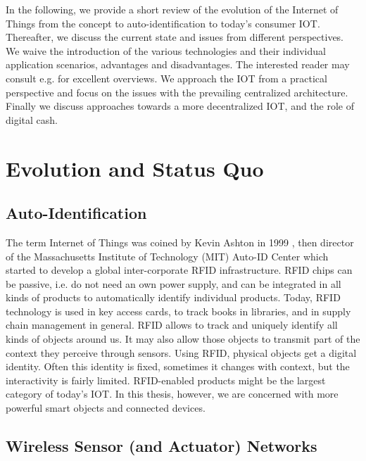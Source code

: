 In the following, we provide a short review of the evolution of the Internet of Things from the concept to auto-identification to today's consumer \ac{IOT}. Thereafter, we discuss the current state and issues from different perspectives. We waive the introduction of the various technologies and their individual application scenarios, advantages and disadvantages. The interested reader may consult e.g. \parencite{Atzori20102787,Mattern2010,Gubbi20131645} for excellent overviews. We approach the \ac{IOT} from a practical perspective and focus on the issues with the prevailing centralized architecture. Finally we discuss approaches towards a more decentralized \ac{IOT}, and the role of digital cash.

\section{Evolution and Status Quo}

\subsection{Auto-Identification}

The term Internet of Things was coined by Kevin Ashton in 1999 \parencite[c.f ][]{ashton2009internet}, then director of the Massachusetts Institute of Technology (MIT) Auto-ID Center which started to develop a global inter-corporate \ac{RFID} infrastructure. \ac{RFID} chips can be passive, i.e. do not need an own power supply, and can be integrated in all kinds of products to automatically identify individual products. Today, \ac{RFID} technology is used in key access cards, to track books in libraries, and in supply chain management in general. \ac{RFID} allows to track and uniquely identify all kinds of objects around us. It may also allow those objects to transmit part of the context they perceive through sensors. Using \ac{RFID}, physical objects get a digital identity. Often this identity is fixed, sometimes it changes with context, but the interactivity is fairly limited. \ac{RFID}-enabled products might be the largest category of today's \ac{IOT}. In this thesis, however, we are concerned with more powerful smart objects and connected devices.  

\subsection{Wireless Sensor (and Actuator) Networks}

